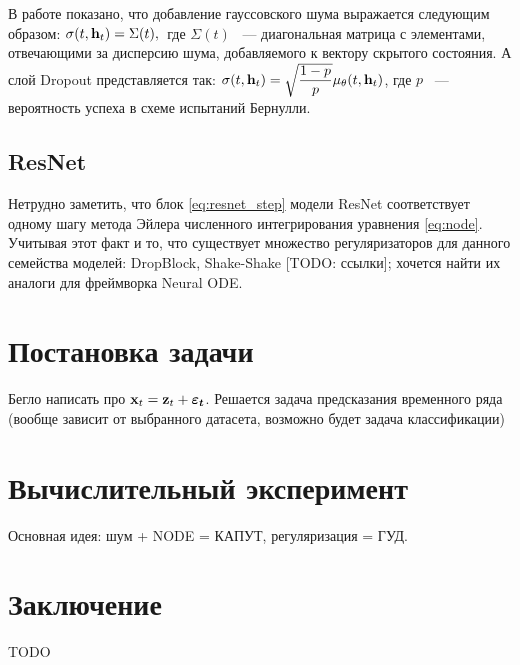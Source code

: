\documentclass[a4paper, 14pt]{article}
\begin{document}
	В работе \cite{Liu2019} показано, что добавление гауссовского шума выражается следующим образом: $\sigma(t, \mathbf{h}_t) = \Sigma(t), \:$ где $\Sigma(t)$ ~--- диагональная матрица с элементами, отвечающими за дисперсию шума, добавляемого к вектору скрытого состояния.
	А слой Dropout представляется так: $\sigma(t, \mathbf{h}_t) = \sqrt{\dfrac{1 - p}{p}} \mu_\theta(t, \mathbf{h}_t)$, где $p$ ~--- вероятность успеха в схеме испытаний Бернулли. 
	
	\subsection{ResNet}
	Нетрудно заметить, что блок \ref{eq:resnet_step} модели ResNet соответствует одному шагу метода Эйлера численного интегрирования уравнения \ref{eq:node}.
	Учитывая этот факт и то, что существует множество регуляризаторов для данного семейства моделей: DropBlock, Shake-Shake [TODO: ссылки]; хочется найти их аналоги для фреймворка Neural ODE.
	
	\section{Постановка задачи}
	Бегло написать про $\mathbf{x}_t = \mathbf{z}_t + \boldsymbol{\varepsilon_t}$. 
	Решается задача предсказания временного ряда (вообще зависит от выбранного датасета, возможно будет задача классификации)
	
	\section{Вычислительный эксперимент}
	Основная идея: шум + NODE = КАПУТ, регуляризация = ГУД.
	
	\section{Заключение}
	TODO
	
	
	
	
\end{document}
